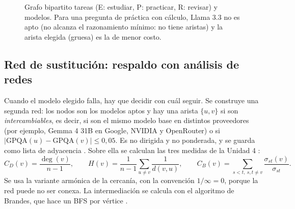 \documentclass[12pt,letterpaper]{article}
\begin{document}
\begin{figure}[htbp]
\centering
{}
\caption{Grafo bipartito tareas (E: estudiar, P: practicar, R: revisar) y modelos. Para una pregunta de práctica con cálculo, Llama 3.3 no es apto (no alcanza el razonamiento mínimo: no tiene aristas) y la arista elegida (gruesa) es la de menor costo.}\label{fig:bipartito}
\end{figure}

\subsection{Red de sustitución: respaldo con análisis de redes}
Cuando el modelo elegido falla, hay que decidir con cuál seguir. Se construye una segunda red: los nodos son los modelos aptos y hay una arista $\{u,v\}$ si son \emph{intercambiables}, es decir, si son el mismo modelo base en distintos proveedores (por ejemplo, Gemma 4 31B en Google, NVIDIA y OpenRouter) o si $|\mathrm{GPQA}(u)-\mathrm{GPQA}(v)|\le 0{,}05$. Es no dirigida y no ponderada, y se guarda como lista de adyacencia \parencite{gomez2026grafos}. Sobre ella se calculan las tres medidas de la Unidad 4 \parencite{gomez2026redes,freeman1978}:
\begin{equation}
C_D(v)=\frac{\deg(v)}{n-1},\qquad H(v)=\frac{1}{n-1}\sum_{u\ne v}\frac{1}{d(v,u)},\qquad C_B(v)=\sum_{s<t,\ s,t\ne v}\frac{\sigma_{st}(v)}{\sigma_{st}}.
\end{equation}
Se usa la variante armónica de la cercanía, con la convención $1/\infty=0$, porque la red puede no ser conexa. La intermediación se calcula con el algoritmo de Brandes, que hace un BFS por vértice \parencite{brandes2001}.
\end{document}

